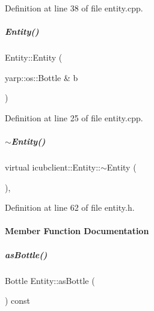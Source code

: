 Definition at line 38 of file entity.\+cpp.

\mbox{\label{group__icubclient__representations_a10efef64904ff6927808373f488703d7}} 
\subparagraph{\texorpdfstring{Entity()}{Entity()}\hspace{0.1cm}{\footnotesize\ttfamily [3/3]}}
{\footnotesize\ttfamily Entity\+::\+Entity (\begin{DoxyParamCaption}\item[{yarp\+::os\+::\+Bottle \&}]{b }\end{DoxyParamCaption})}



Definition at line 25 of file entity.\+cpp.

\mbox{\label{group__icubclient__representations_afb1d60fc54152b596f18de2538688863}} 
\subparagraph{\texorpdfstring{$\sim$\+Entity()}{~Entity()}}
{\footnotesize\ttfamily virtual icubclient\+::\+Entity\+::$\sim$\+Entity (\begin{DoxyParamCaption}{ }\end{DoxyParamCaption})\hspace{0.3cm}{\ttfamily [inline]}, {\ttfamily [virtual]}}



Definition at line 62 of file entity.\+h.



\paragraph{Member Function Documentation}
\mbox{\label{group__icubclient__representations_a1481200655f5b88c81a9fa19941fd841}} 
\subparagraph{\texorpdfstring{as\+Bottle()}{asBottle()}}
{\footnotesize\ttfamily Bottle Entity\+::as\+Bottle (\begin{DoxyParamCaption}{ }\end{DoxyParamCaption}) const\hspace{0.3cm}{\ttfamily [virtual]}}



